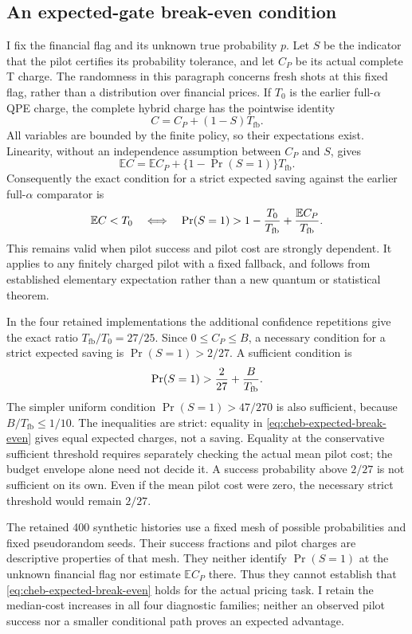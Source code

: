 \documentclass[11pt]{article}
\begin{document}
\subsection{An expected-gate break-even condition}

I fix the financial flag and its unknown true probability $p$. Let $S$
be the indicator that the pilot certifies its probability tolerance, and
let $C_P$ be its actual complete T charge. The randomness in this
paragraph concerns fresh shots at this fixed flag, rather than a
distribution over financial prices. If $T_0$ is the earlier full-$\alpha$
QPE charge, the complete hybrid charge has the pointwise identity
\[
 C=C_P+(1-S)T_{\mathrm{fb}}.
\]
All variables are bounded by the finite policy, so their expectations
exist. Linearity, without an independence assumption between $C_P$ and
$S$, gives
\[
 \mathbb EC=\mathbb EC_P+
       \{1-\Pr(S=1)\}T_{\mathrm{fb}}.
\]
Consequently the exact condition for a strict expected saving against
the earlier full-$\alpha$ comparator is
\begin{equation}
 \mathbb EC<T_0
 \quad\Longleftrightarrow\quad
 \Pr(S=1)>1-{T_0\over T_{\mathrm{fb}}}
                   +{\mathbb EC_P\over T_{\mathrm{fb}}}.
 \label{eq:cheb-expected-break-even}
\end{equation}
This remains valid when pilot success and pilot cost are strongly
dependent. It applies to any finitely charged pilot with a fixed
fallback, and follows from established elementary expectation rather
than a new quantum or statistical theorem.

In the four retained implementations the additional confidence
repetitions give the exact ratio $T_{\mathrm{fb}}/T_0=27/25$.
Since $0\leq C_P\leq B$, a necessary condition for a strict expected
saving is $\Pr(S=1)>2/27$. A sufficient condition is
\[
 \Pr(S=1)>{2\over27}+{B\over T_{\mathrm{fb}}}.
\]
The simpler uniform condition $\Pr(S=1)>47/270$ is also sufficient,
because $B/T_{\mathrm{fb}}\leq1/10$. The inequalities are strict:
equality in \eqref{eq:cheb-expected-break-even} gives equal expected
charges, not a saving. Equality at the conservative sufficient
threshold requires separately checking the actual mean pilot cost;
the budget envelope alone need not decide it. A success probability
above $2/27$ is not sufficient on its own. Even if the mean pilot cost
were zero, the necessary strict threshold would remain $2/27$.

The retained 400 synthetic histories use a fixed mesh of possible
probabilities and fixed pseudorandom seeds. Their success fractions and
pilot charges are descriptive properties of that mesh. They neither
identify $\Pr(S=1)$ at the unknown financial flag nor estimate
$\mathbb EC_P$ there. Thus they cannot establish that
\eqref{eq:cheb-expected-break-even} holds for the actual pricing task.
I retain the median-cost increases in all four diagnostic families;
neither an observed pilot success nor a smaller conditional path proves
an expected advantage.
\end{document}
